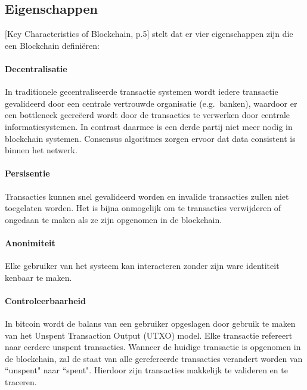 \clearpage
\subsection{Eigenschappen}

\cite{zheng2017overview}[Key Characteristics of Blockchain, p.5] stelt dat er vier eigenschappen zijn die een Blockchain definiëren:

\paragraph{Decentralisatie} In traditionele gecentraliseerde transactie systemen wordt iedere transactie gevalideerd door een centrale vertrouwde organisatie (e.g.\ banken), waardoor er een bottleneck gecreëerd wordt door de transacties te verwerken door centrale informatiesystemen. In contrast daarmee is een derde partij niet meer nodig in blockchain systemen. Consensus algoritmes zorgen ervoor dat data consistent is binnen het netwerk.

\paragraph{Persisentie} Transacties kunnen snel gevalideerd worden en invalide transacties zullen niet toegelaten worden. Het is bijna onmogelijk om te transacties verwijderen of ongedaan te maken als ze zijn opgenomen in de blockchain.

\paragraph{Anonimiteit} Elke gebruiker van het systeem kan interacteren zonder zijn ware identiteit kenbaar te maken.

\paragraph{Controleerbaarheid} In bitcoin wordt de balans van een gebruiker opgeslagen door gebruik te maken van het Unspent Transaction Output (UTXO) model. Elke transactie refereert naar eerdere unspent transacties. Wanneer de huidige transactie is opgenomen in de blockchain, zal de staat van alle gerefereerde transacties verandert worden van ``unspent" naar ``spent". Hierdoor zijn transacties makkelijk te valideren en te traceren.